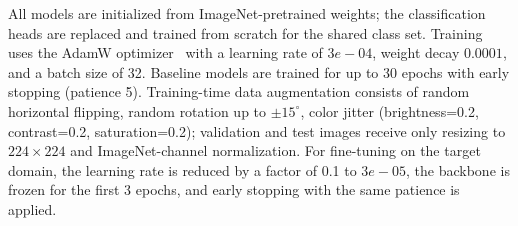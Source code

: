 All models are initialized from ImageNet-pretrained weights; the classification heads are replaced and trained from scratch for the shared class set. Training uses the AdamW optimizer~\cite{loshchilov2019adamw} with a learning rate of ${3e-04}$, weight decay ${0.0001}$, and a batch size of 32. Baseline models are trained for up to 30 epochs with early stopping (patience 5). Training-time data augmentation consists of random horizontal flipping, random rotation up to $\pm15^\circ$, color jitter (brightness=0.2, contrast=0.2, saturation=0.2); validation and test images receive only resizing to $224 \times 224$ and ImageNet-channel normalization. For fine-tuning on the target domain, the learning rate is reduced by a factor of 0.1 to ${3e-05}$, the backbone is frozen for the first 3 epochs, and early stopping with the same patience is applied.